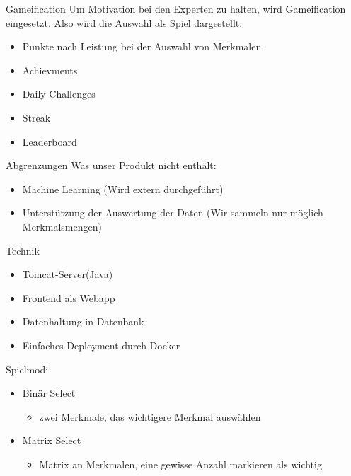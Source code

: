 \documentclass[xcolor=dvipsnames]{beamer}
\begin{document}
    \begin{frame}{Gameification}
    Um Motivation bei den Experten zu halten, wird Gameification eingesetzt. Also wird die Auswahl als Spiel dargestellt.
        \begin{itemize}
            \item Punkte nach Leistung bei der Auswahl von Merkmalen
            \item Achievments
            \item Daily Challenges
            \item Streak
            \item Leaderboard
        \end{itemize}
    \end{frame}
    \begin{frame}{Abgrenzungen}
        Was unser Produkt nicht enthält:
        \begin{itemize}
            \item Machine Learning (Wird extern durchgeführt)
            \item Unterstützung der Auswertung der Daten (Wir sammeln nur möglich Merkmalsmengen)
        \end{itemize}
    \end{frame}
    \begin{frame}{Technik}
        \begin{itemize}
            \item Tomcat-Server(Java)
            \item Frontend als Webapp
            \item Datenhaltung in Datenbank
            \item Einfaches Deployment durch Docker
        \end{itemize}
    \end{frame}
    \begin{frame}{Spielmodi}
        \begin{itemize}
            \item Binär Select 
                \begin{itemize}
                    \item zwei Merkmale, das wichtigere Merkmal auswählen
                \end{itemize}
            \item Matrix Select
                \begin{itemize}
                    \item Matrix an Merkmalen, eine gewisse Anzahl markieren als wichtig
                \end{itemize}
        \end{itemize}
    \end{frame}
\end{document}
